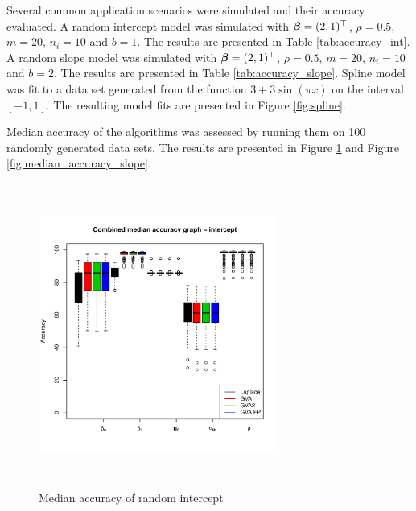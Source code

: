 \documentclass{amsart}[12pt]
\begin{document}
	\noindent Several common application scenarios were simulated and their accuracy evaluated. A random intercept model was simulated with ${\boldsymbol \beta} = (2, 1)^\top$, $\rho = 0.5$, $m = 20$, $n_i = 10$ and $b = 1$. The results are
	presented in Table \ref{tab:accuracy_int}. A random slope model was simulated with ${\boldsymbol \beta} = (2, 1)^\top$,
	$\rho = 0.5$, $m = 20$, $n_i = 10$ and $b = 2$. The results are presented in Table \ref{tab:accuracy_slope}.
	Spline model was fit to a data set generated from the function $3 + 3 \sin{(\pi x)}$ on the interval $[-1,
	1]$. The resulting model fits are presented in Figure \ref{fig:spline}.
		
		
	\noindent Median accuracy of the algorithms was assessed by running them on 100 randomly generated data sets. The	results are presented in Figure \ref{fig:median_accuracy_intercept} and Figure
	\ref{fig:median_accuracy_slope}.
		
	\begin{figure}
		\begin{center}
			\includegraphics[width=0.7\textwidth, height=100mm]{code/results/median_accuracy_combined_intercept.pdf}
			\caption{Median accuracy of random intercept}
			\label{fig:median_accuracy_intercept}
		\end{center}
	\end{figure}
		
\end{document}
